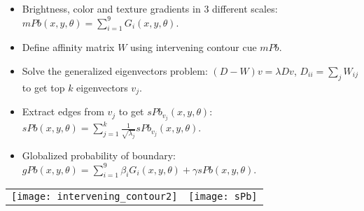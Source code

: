 \documentclass[11pt, a4paper, landscape]{article}
\begin{document}
\NewPage{}
\small
\vfill
\begin{itemize}
\item Brightness, color and texture gradients in 3 different scales: $mPb(x, y, \theta) = \sum\limits_{i = 1}^{9} G_i(x, y, \theta)$.
\item Define affinity matrix $W$ using intervening contour cue $mPb$.
\item Solve the generalized eigenvectors problem: $(D - W)v = \lambda D v$, $D_{ii} = \sum_j W_{ij}$\\ to get top $k$ eigenvectors $v_j$.
\item Extract edges from $v_j$ to get $sPb_{v_j}(x, y, \theta)$: $sPb(x, y, \theta) = \sum\limits_{j = 1}^{k} \frac{1}{\sqrt{\lambda_j}} sPb_{v_j} (x, y, \theta)$.
\item Globalized probability of boundary: $gPb(x, y, \theta) = \sum\limits_{i = 1}^{9} \beta_iG_i(x, y, \theta) + \gamma sPb(x, y, \theta)$.
\end{itemize}
\begin{table}
  \centering
  \begin{tabular}{@{} M{.3\linewidth} M{.7\linewidth} @{}}
      \texttt{[image: intervening\_contour2]}%
      &
      \texttt{[image: sPb]}%
  \end{tabular}
\end{table}
\vfill
\end{document}
